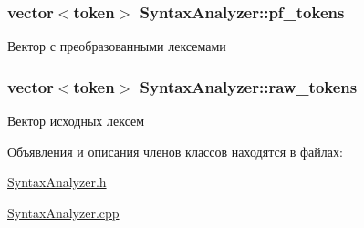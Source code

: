 \subsubsection[{\texorpdfstring{pf\+\_\+tokens}{pf_tokens}}]{\setlength{\rightskip}{0pt plus 5cm}vector$<${\bf token}$>$ Syntax\+Analyzer\+::pf\+\_\+tokens\hspace{0.3cm}{\ttfamily [private]}}\hypertarget{class_syntax_analyzer_aadc7ff59a663670756f4ab5e81f7d99a}{}\label{class_syntax_analyzer_aadc7ff59a663670756f4ab5e81f7d99a}


Вектор с преобразованными лексемами 

\subsubsection[{\texorpdfstring{raw\+\_\+tokens}{raw_tokens}}]{\setlength{\rightskip}{0pt plus 5cm}vector$<${\bf token}$>$ Syntax\+Analyzer\+::raw\+\_\+tokens\hspace{0.3cm}{\ttfamily [private]}}\hypertarget{class_syntax_analyzer_aea5a27bee70623ed8bf91972938d39af}{}\label{class_syntax_analyzer_aea5a27bee70623ed8bf91972938d39af}


Вектор исходных лексем 



Объявления и описания членов классов находятся в файлах\+:\begin{DoxyCompactItemize}
\item 
\hyperlink{_syntax_analyzer_8h}{Syntax\+Analyzer.\+h}\item 
\hyperlink{_syntax_analyzer_8cpp}{Syntax\+Analyzer.\+cpp}\end{DoxyCompactItemize}
